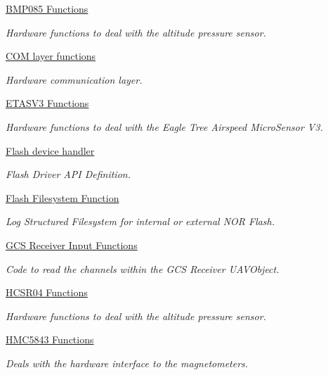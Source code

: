 \begin{DoxyCompactItemize}
\hyperlink{group___p_i_o_s___b_m_p085}{B\-M\-P085 Functions}
\begin{DoxyCompactList}\small\item\em Hardware functions to deal with the altitude pressure sensor. \end{DoxyCompactList}\item 
\hyperlink{group___p_i_o_s___c_o_m}{C\-O\-M layer functions}
\begin{DoxyCompactList}\small\item\em Hardware communication layer. \end{DoxyCompactList}\item 
\hyperlink{group___p_i_o_s___e_t_a_s_v3}{E\-T\-A\-S\-V3 Functions}
\begin{DoxyCompactList}\small\item\em Hardware functions to deal with the Eagle Tree Airspeed Micro\-Sensor V3. \end{DoxyCompactList}\item 
\hyperlink{group___p_i_o_s___f_l_a_s_h}{Flash device handler}
\begin{DoxyCompactList}\small\item\em Flash Driver A\-P\-I Definition. \end{DoxyCompactList}\item 
\hyperlink{group___p_i_o_s___f_l_a_s_h_f_s}{Flash Filesystem Function}
\begin{DoxyCompactList}\small\item\em Log Structured Filesystem for internal or external N\-O\-R Flash. \end{DoxyCompactList}\item 
\hyperlink{group___p_i_o_s___g_c_s_r_c_v_r}{G\-C\-S Receiver Input Functions}
\begin{DoxyCompactList}\small\item\em Code to read the channels within the G\-C\-S Receiver U\-A\-V\-Object. \end{DoxyCompactList}\item 
\hyperlink{group___p_i_o_s___h_c_s_r04}{H\-C\-S\-R04 Functions}
\begin{DoxyCompactList}\small\item\em Hardware functions to deal with the altitude pressure sensor. \end{DoxyCompactList}\item 
\hyperlink{group___p_i_o_s___h_m_c5843}{H\-M\-C5843 Functions}
\begin{DoxyCompactList}\small\item\em Deals with the hardware interface to the magnetometers. \end{DoxyCompactList}\item 

\end{DoxyCompactItemize}
